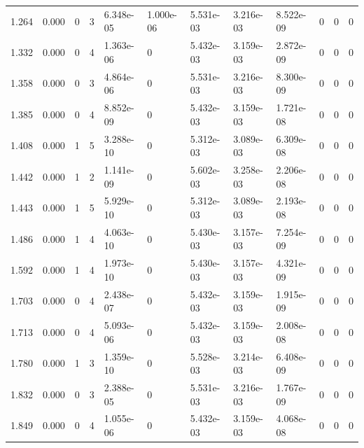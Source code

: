 \documentclass[preview]{standalone}
\begin{document}
{{\begin{tabular}{L{1.2cm}C{1.2cm} C{0.3cm}C{0.5cm} C{1.4cm}C{1.4cm} C{1.4cm}C{1.4cm} C{1.6cm}C{1.6cm} C{1.6cm}C{1.6cm}}
  1.264  &  0.000  & 0     &  3 &  6.348e-05  & 1.000e-06  &  5.531e-03&   3.216e-03& 8.522e-09 & 0   &  0 & 0  \\ 
  1.332  &  0.000  & 0     &  4 &  1.363e-06  & 0  &  5.432e-03&   3.159e-03& 2.872e-09 & 0   &  0 & 0  \\ 
  1.358  &  0.000  & 0     &  3 &  4.864e-06  & 0  &  5.531e-03&   3.216e-03& 8.300e-09 & 0   &  0 & 0  \\ 
  1.385  &  0.000  & 0     &  4 &  8.852e-09  & 0  &  5.432e-03&   3.159e-03& 1.721e-08 & 0   &  0 & 0  \\ 
  1.408  &  0.000  & 1     &  5 &  3.288e-10  & 0  &  5.312e-03&   3.089e-03& 6.309e-08 & 0   &  0 & 0  \\ 
  1.442  &  0.000  & 1     &  2 &  1.141e-09  & 0  &  5.602e-03&   3.258e-03& 2.206e-08 & 0   &  0 & 0  \\ 
  1.443  &  0.000  & 1     &  5 &  5.929e-10  & 0  &  5.312e-03&   3.089e-03& 2.193e-08 & 0   &  0 & 0  \\ 
  1.486  &  0.000  & 1     &  4 &  4.063e-10  & 0  &  5.430e-03&   3.157e-03& 7.254e-09 & 0   &  0 & 0  \\ 
  1.592  &  0.000  & 1     &  4 &  1.973e-10  & 0  &  5.430e-03&   3.157e-03& 4.321e-09 & 0   &  0 & 0  \\ 
  1.703  &  0.000  & 0     &  4 &  2.438e-07  & 0  &  5.432e-03&   3.159e-03& 1.915e-09 & 0   &  0 & 0  \\ 
  1.713  &  0.000  & 0     &  4 &  5.093e-06  & 0  &  5.432e-03&   3.159e-03& 2.008e-08 & 0   &  0 & 0  \\ 
  1.780  &  0.000  & 1     &  3 &  1.359e-10  & 0  &  5.528e-03&   3.214e-03& 6.408e-09 & 0   &  0 & 0  \\ 
  1.832  &  0.000  & 0     &  3 &  2.388e-05  & 0  &  5.531e-03&   3.216e-03& 1.767e-09 & 0   &  0 & 0  \\ 
  1.849  &  0.000  & 0     &  4 &  1.055e-06  & 0  &  5.432e-03&   3.159e-03& 4.068e-08 & 0   &  0 & 0  \\ 
\hline 
\end{tabular} 

}}
\end{document}
